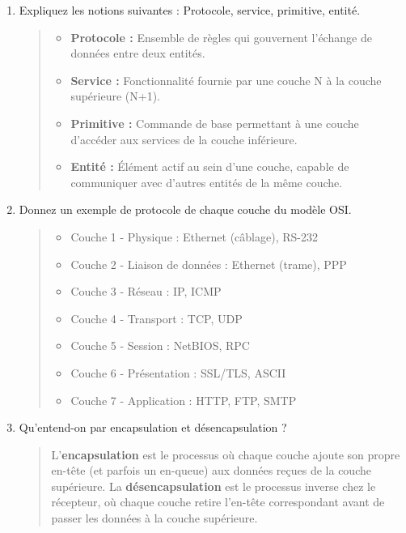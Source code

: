 \documentclass[a4paper,12pt]{article}
\begin{document}
\begin{enumerate}
    \item Expliquez les notions suivantes : Protocole, service, primitive, entité.
    \begin{quote}
        \begin{itemize}
            \item \textbf{Protocole :} Ensemble de règles qui gouvernent l'échange de données entre deux entités.
            \item \textbf{Service :} Fonctionnalité fournie par une couche N à la couche supérieure (N+1).
            \item \textbf{Primitive :} Commande de base permettant à une couche d'accéder aux services de la couche inférieure.
            \item \textbf{Entité :} Élément actif au sein d'une couche, capable de communiquer avec d'autres entités de la même couche.
        \end{itemize}
    \end{quote}

    \item Donnez un exemple de protocole de chaque couche du modèle OSI.
    \begin{quote}
        \begin{itemize}
            \item Couche 1 - Physique : Ethernet (câblage), RS-232
            \item Couche 2 - Liaison de données : Ethernet (trame), PPP
            \item Couche 3 - Réseau : IP, ICMP
            \item Couche 4 - Transport : TCP, UDP
            \item Couche 5 - Session : NetBIOS, RPC
            \item Couche 6 - Présentation : SSL/TLS, ASCII
            \item Couche 7 - Application : HTTP, FTP, SMTP
        \end{itemize}
    \end{quote}
    
    \item Qu'entend-on par encapsulation et désencapsulation ?
    \begin{quote}
        L'\textbf{encapsulation} est le processus où chaque couche ajoute son propre en-tête (et parfois un en-queue) aux données reçues de la couche supérieure. La \textbf{désencapsulation} est le processus inverse chez le récepteur, où chaque couche retire l'en-tête correspondant avant de passer les données à la couche supérieure.
    \end{quote}
\end{enumerate}
\end{document}
